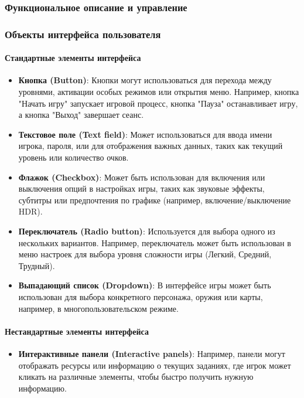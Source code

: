 \documentclass{article}
\begin{document}
\begin{itemize}
\subsubsection{Функциональное описание и управление}

\subsubsection{Объекты интерфейса пользователя}

\paragraph{Стандартные элементы интерфейса}
\begin{itemize}
    \item \textbf{Кнопка (Button)}: Кнопки могут использоваться для перехода между уровнями, активации особых режимов или открытия меню. Например, кнопка "Начать игру" запускает игровой процесс, кнопка "Пауза" останавливает игру, а кнопка "Выход" завершает сеанс.
    
    \item \textbf{Текстовое поле (Text field)}: Может использоваться для ввода имени игрока, пароля, или для отображения важных данных, таких как текущий уровень или количество очков.
    
    \item \textbf{Флажок (Checkbox)}: Может быть использован для включения или выключения опций в настройках игры, таких как звуковые эффекты, субтитры или предпочтения по графике (например, включение/выключение HDR).
    
    \item \textbf{Переключатель (Radio button)}: Используется для выбора одного из нескольких вариантов. Например, переключатель может быть использован в меню настроек для выбора уровня сложности игры (Легкий, Средний, Трудный).
    
    \item \textbf{Выпадающий список (Dropdown)}: В интерфейсе игры может быть использован для выбора конкретного персонажа, оружия или карты, например, в многопользовательском режиме.
\end{itemize}

\paragraph{Нестандартные элементы интерфейса}
\begin{itemize}
    \item \textbf{Интерактивные панели (Interactive panels)}: Например, панели могут отображать ресурсы или информацию о текущих заданиях, где игрок может кликать на различные элементы, чтобы быстро получить нужную информацию.
    

\end{itemize}
\end{itemize}
\end{document}
